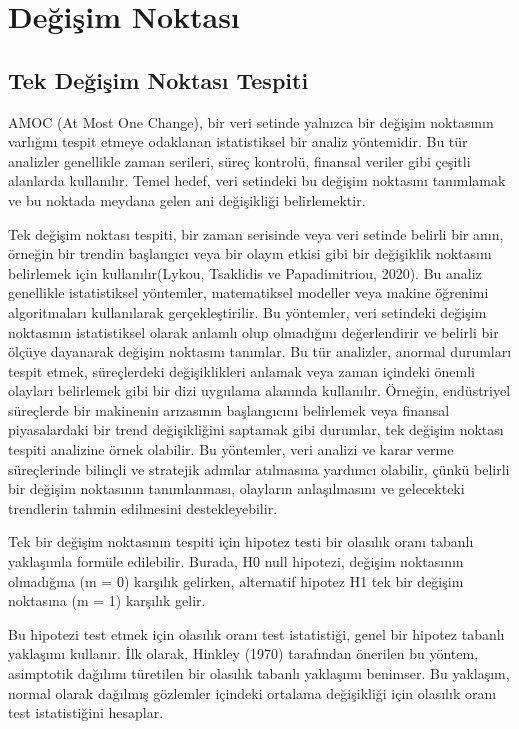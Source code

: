 \documentclass[12pt,twoside]{deuthesis}
\begin{document}
\chapter{Değişim Noktası}\label{Bolum2}

\section{Tek Değişim Noktası Tespiti}\label{tek-deux11fiux15fim-noktasux131-tespiti}

AMOC (At Most One Change), bir veri setinde yalnızca bir değişim noktasının varlığını tespit etmeye odaklanan istatistiksel bir analiz yöntemidir. Bu tür analizler genellikle zaman serileri, süreç kontrolü, finansal veriler gibi çeşitli alanlarda kullanılır. Temel hedef, veri setindeki bu değişim noktasını tanımlamak ve bu noktada meydana gelen ani değişikliği belirlemektir.

Tek değişim noktası tespiti, bir zaman serisinde veya veri setinde belirli bir anın, örneğin bir trendin başlangıcı veya bir olayın etkisi gibi bir değişiklik noktasını belirlemek için kullanılır(Lykou, Tsaklidis ve Papadimitriou, 2020). Bu analiz genellikle istatistiksel yöntemler, matematiksel modeller veya makine öğrenimi algoritmaları kullanılarak gerçekleştirilir. Bu yöntemler, veri setindeki değişim noktasının istatistiksel olarak anlamlı olup olmadığını değerlendirir ve belirli bir ölçüye dayanarak değişim noktasını tanımlar. Bu tür analizler, anormal durumları tespit etmek, süreçlerdeki değişiklikleri anlamak veya zaman içindeki önemli olayları belirlemek gibi bir dizi uygulama alanında kullanılır. Örneğin, endüstriyel süreçlerde bir makinenin arızasının başlangıcını belirlemek veya finansal piyasalardaki bir trend değişikliğini saptamak gibi durumlar, tek değişim noktası tespiti analizine örnek olabilir. Bu yöntemler, veri analizi ve karar verme süreçlerinde bilinçli ve stratejik adımlar atılmasına yardımcı olabilir, çünkü belirli bir değişim noktasının tanımlanması, olayların anlaşılmasını ve gelecekteki trendlerin tahmin edilmesini destekleyebilir.

Tek bir değişim noktasının tespiti için hipotez testi bir olasılık oranı tabanlı yaklaşımla formüle edilebilir. Burada, H0 null hipotezi, değişim noktasının olmadığına (m = 0) karşılık gelirken, alternatif hipotez H1 tek bir değişim noktasına (m = 1) karşılık gelir.

Bu hipotezi test etmek için olasılık oranı test istatistiği, genel bir hipotez tabanlı yaklaşımı kullanır. İlk olarak, Hinkley (1970) tarafından önerilen bu yöntem, asimptotik dağılımı türetilen bir olasılık tabanlı yaklaşımı benimser. Bu yaklaşım, normal olarak dağılmış gözlemler içindeki ortalama değişikliği için olasılık oranı test istatistiğini hesaplar.
\end{document}
